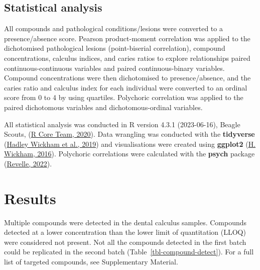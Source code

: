 \documentclass[
  letterpaper,
]{book}
\begin{document}
\hypertarget{statistical-analysis-1}{%
\subsection{Statistical analysis}\label{statistical-analysis-1}}

All compounds and pathological conditions/lesions were converted to a
presence/absence score. Pearson product-moment correlation was applied
to the dichotomised pathological lesions (point-biserial correlation),
compound concentrations, calculus indices, and caries ratios to explore
relationships paired continuous-continuous variables and paired
continuous-binary variables. Compound concentrations were then
dichotomised to presence/absence, and the caries ratio and calculus
index for each individual were converted to an ordinal score from 0 to 4
by using quartiles. Polychoric correlation was applied to the paired
dichotomous variables and dichotomous-ordinal variables.

All statistical analysis was conducted in R version 4.3.1 (2023-06-16),
Beagle Scouts, (\protect\hyperlink{ref-Rbase}{R Core Team, 2020}). Data
wrangling was conducted with the \textbf{tidyverse}
(\protect\hyperlink{ref-tidyverse2019}{Hadley Wickham et al., 2019}) and
visualisations were created using \textbf{ggplot2}
(\protect\hyperlink{ref-ggplot2}{H. Wickham, 2016}). Polychoric
correlations were calculated with the \textbf{psych} package
(\protect\hyperlink{ref-Rpsych}{Revelle, 2022}).

\hypertarget{results-2}{%
\section{Results}\label{results-2}}

Multiple compounds were detected in the dental calculus samples.
Compounds detected at a lower concentration than the lower limit of
quantitation (LLOQ) were considered not present. Not all the compounds
detected in the first batch could be replicated in the second batch
(Table~\ref{tbl-compound-detect}). For a full list of targeted
compounds, see Supplementary Material.
\end{document}
